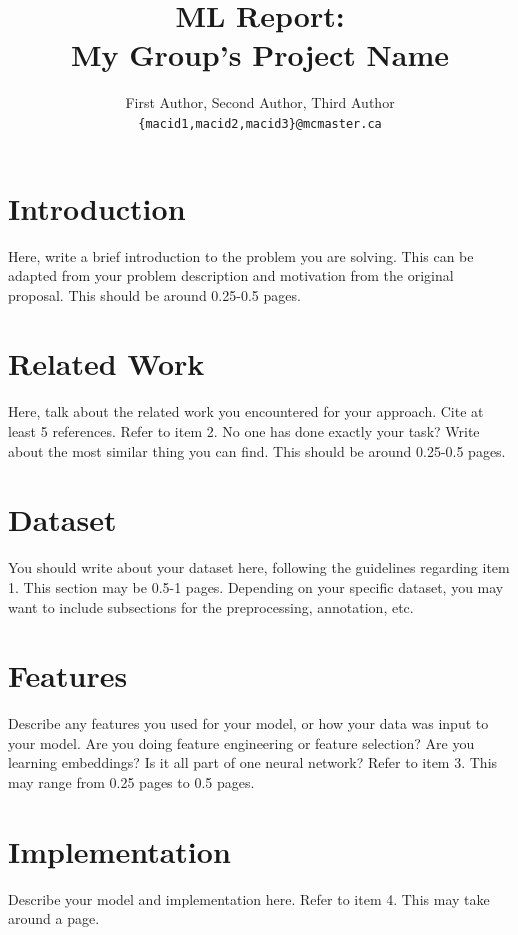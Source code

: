 \documentclass[11pt]{article}
\title{ML Report:\\My Group's Project Name}
\author{First Author, Second Author, Third Author \\
  \texttt{\{macid1,macid2,macid3\}@mcmaster.ca} }
\begin{document}
\maketitle

\section{Introduction}

Here, write a brief introduction to the problem you are solving. This can be adapted from your problem description and motivation from the original proposal. This should be around 0.25-0.5 pages.

\section{Related Work}

Here, talk about the related work you encountered for your approach. Cite at least 5 references. Refer to item 2. No one has done exactly your task? Write about the most similar thing you can find. This should be around 0.25-0.5 pages.

\section{Dataset}

You should write about your dataset here, following the guidelines regarding item 1. This section may be 0.5-1 pages. Depending on your specific dataset, you may want to include subsections for the preprocessing, annotation, etc.

\section{Features}

Describe any features you used for your model, or how your data was input to your model. Are you doing feature engineering or feature selection? Are you learning embeddings? Is it all part of one neural network? Refer to item 3. This may range from 0.25 pages to 0.5 pages.

\section{Implementation}

Describe your model and implementation here. Refer to item 4. This may take around a page.
\end{document}
